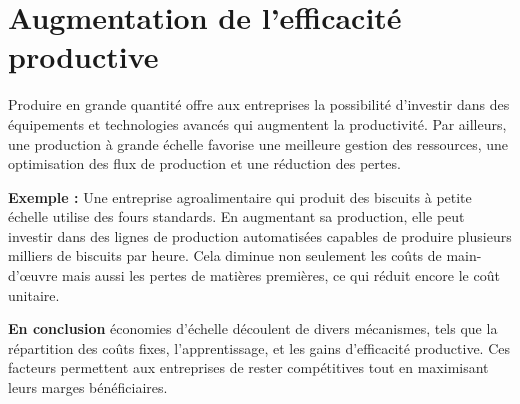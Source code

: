 \section{Augmentation de l'efficacité productive}
Produire en grande quantité offre aux entreprises la possibilité d’investir dans des
équipements et technologies avancés qui augmentent la productivité. Par ailleurs,
une production à grande échelle favorise une meilleure gestion des ressources,
une optimisation des flux de production et une réduction des pertes.

\par
\textbf{Exemple :}
Une entreprise agroalimentaire qui produit des biscuits à petite échelle utilise des
fours standards. En augmentant sa production, elle peut investir dans des lignes
de production automatisées capables de produire plusieurs milliers de biscuits par
heure. Cela diminue non seulement les coûts de main-d'œuvre mais aussi les
pertes de matières premières, ce qui réduit encore le coût unitaire.

\par
\par

\textbf{En conclusion} économies d'échelle découlent de divers mécanismes, tels que
la répartition des coûts fixes, l’apprentissage, et les gains d’efficacité productive.
Ces facteurs permettent aux entreprises de rester compétitives tout en
maximisant leurs marges bénéficiaires.
